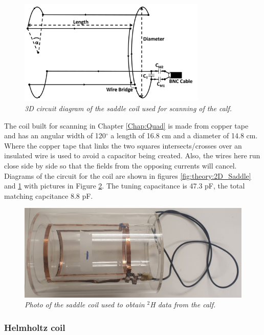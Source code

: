\begin{figure}
    \centering
    \includegraphics[width=0.8\textwidth]{Figures/Theory/3D_Saddle.png}
    \caption{\textit{3D circuit diagram of the saddle coil used for scanning of the calf.}}
    \label{fig:theory:3D_Saddle}
\end{figure}

The coil built for scanning in Chapter \ref{Chap:Quad} is made from copper tape and has an angular width of 120$^\circ$ a length of 16.8 cm and a diameter of 14.8 cm. Where the copper tape that links the two squares intersects/crosses over an insulated wire is used to avoid a capacitor being created. Also, the wires here run close side by side so that the fields from the opposing currents will cancel. Diagrams of the circuit for the coil are shown in figures \ref{fig:theory:2D_Saddle} and \ref{fig:theory:3D_Saddle} with pictures in Figure \ref{fig:theory:Saddle_pic}. The tuning capacitance is 47.3 pF, the total matching capcitance 8.8 pF.

\begin{figure}
    \centering
    \includegraphics[width=1\textwidth]{Figures/Theory/Saddle_Coil.jpg}
    \caption{\textit{Photo of the saddle coil used to obtain $^2$H data from the calf.}}
    \label{fig:theory:Saddle_pic}
\end{figure}

\subsubsection{Helmholtz coil}

